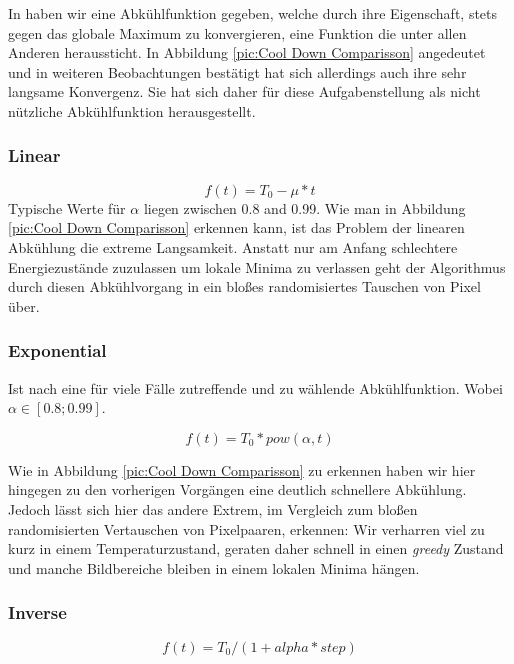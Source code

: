 In \cite{hajek1988cooling} haben wir eine Abkühlfunktion gegeben, welche durch ihre Eigenschaft,
stets gegen das globale Maximum zu konvergieren, eine Funktion die unter allen Anderen heraussticht.
In Abbildung \ref{pic:Cool Down Comparisson} angedeutet und in weiteren Beobachtungen bestätigt hat sich 
allerdings auch ihre sehr langsame Konvergenz.
Sie hat sich daher für diese Aufgabenstellung als nicht nützliche Abkühlfunktion herausgestellt.

\subsubsection{Linear}

\begin{equation}\label{eq:lineare Abkühlung}
    f(t) = T_0 - \mu*t
\end{equation}
Typische Werte für $\alpha$ liegen zwischen 0.8 and 0.99. Wie man in Abbildung \ref{pic:Cool Down Comparisson}
erkennen kann, ist das Problem der linearen Abkühlung die extreme Langsamkeit.
Anstatt nur am Anfang schlechtere Energiezustände zuzulassen um lokale Minima zu verlassen 
geht der Algorithmus durch diesen Abkühlvorgang in ein bloßes randomisiertes Tauschen von Pixel über.

\subsubsection{Exponential}
Ist nach \cite{Kirkpatrick671} eine für viele Fälle zutreffende und zu wählende Abkühlfunktion.
Wobei $\alpha \in [0.8; 0.99]$.

\begin{equation}\label{eq:Exponential}
    f(t) = T_0*pow(\alpha,t)
\end{equation}

Wie in Abbildung \ref{pic:Cool Down Comparisson} zu erkennen haben wir hier hingegen zu den vorherigen Vorgängen
eine deutlich schnellere Abkühlung. Jedoch lässt sich hier das andere Extrem, im Vergleich zum bloßen randomisierten
Vertauschen von Pixelpaaren, erkennen: Wir verharren viel zu kurz in einem Temperaturzustand, geraten daher schnell 
in einen \textit{greedy} Zustand und manche Bildbereiche bleiben in einem lokalen Minima hängen.

\subsubsection{Inverse}

\begin{equation}\label{eq:Inverse}
    f(t) = T_0 / (1 + alpha * step)
\end{equation}

